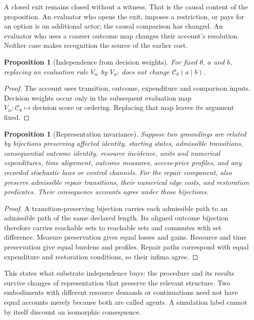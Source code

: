 \documentclass[11pt,a4paper]{article}
\newtheorem{proposition}[definition]{Proposition}
\theoremstyle{remark}
\newcommand{\C}{\mathcal C}
\begin{document}
A closed exit remains closed without a witness. That is the causal content of
the proposition. An evaluator who opens the exit, imposes a restriction, or
pays for an option is an additional actor; the causal comparison has changed.
An evaluator who uses a coarser outcome map changes their account's resolution.
Neither case makes recognition the source of the earlier cost.

\begin{proposition}[Independence from decision weights]\label{prop:weights}
For fixed $\theta$, $a$ and $b$, replacing an evaluation rule $V_w$ by $V_{w'}$
does not change $\C_\theta(a\mid b)$.
\end{proposition}
\begin{proof}
The account uses transition, outcome, expenditure and comparison inputs.
Decision weights occur only in the subsequent evaluation map
$V_w:\C_\theta\mapsto\text{decision score or ordering}$. Replacing that map
leaves its argument fixed.
\end{proof}

\begin{proposition}[Representation invariance]\label{prop:representation}
Suppose two groundings are related by bijections preserving affected identity,
starting states, admissible transitions, consequential outcome identity,
resource incidence, units and numerical expenditures, time alignment, outcome
measures, access-price profiles, and any recorded stochastic laws or control
channels. For the repair component, also preserve
admissible repair transitions, their numerical edge costs, and restoration
predicates. Their
consequence accounts agree under those bijections.
\end{proposition}
\begin{proof}
A transition-preserving bijection carries each admissible path to an admissible
path of the same declared length. Its aligned outcome bijection therefore
carries reachable sets to reachable sets and commutes with set difference.
Measure preservation gives equal losses and gains. Resource and time
preservation give equal burdens and profiles. Repair paths correspond with
equal expenditure and restoration conditions, so their infima agree.
\end{proof}

This states what substrate independence buys: the procedure and its results
survive changes of representation that preserve the relevant structure. Two
embodiments with different resource demands or continuations need not have equal
accounts merely because both are called agents. A simulation label cannot by
itself discount an isomorphic consequence.
\end{document}
